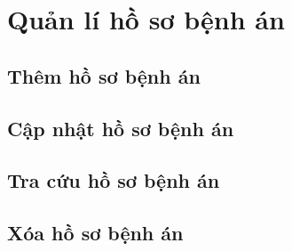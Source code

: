 \section{Quản lí hồ sơ bệnh án}

\subsection{Thêm hồ sơ bệnh án}

\subsection{Cập nhật hồ sơ bệnh án}

\subsection{Tra cứu hồ sơ bệnh án}

\subsection{Xóa hồ sơ bệnh án}